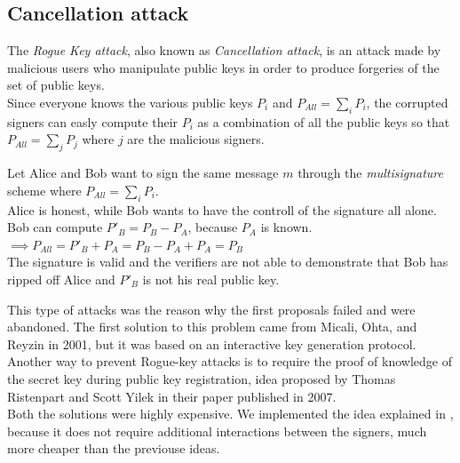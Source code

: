 \subsection{Cancellation attack}
The \textit{Rogue Key attack}, also known as \textit{Cancellation attack}, is an attack made by malicious users who manipulate public keys in order to produce forgeries of the set of public keys.\\
Since everyone knows the various public keys $P_{i}$ and $P_{All}=\sum_{i} P_{i}$, the corrupted signers can easly compute their $P_{i}$ as a combination of all the public keys so that $P_{All}=\sum_{j} P_{j}$ where $j$ are the malicious signers.
\begin{example}
	Let Alice and Bob want to sign the same message $m$ through the \textit{multisignature} scheme where $P_{All}=\sum_{i} P_{i}$.\\
	Alice is honest, while Bob wants to have the controll of the signature all alone.\\
	Bob can compute $P'_{B}=P_{B}-P_{A}$, because $P_{A}$ is known. \\
	$\implies P_{All}=P'_{B}+P_{A}=P_{B}-P_{A}+P_{A}=P_{B}$\\
	The signature is valid and the verifiers are not able to demonstrate that Bob has ripped off Alice and $P'_{B}$ is not his real public key.
\end{example}
This type of attacks was the reason why the first proposals failed and were abandoned. The first solution to this problem came from Micali, Ohta, and Reyzin in 2001, but it was based on an interactive key generation protocol.\\
Another way to prevent Rogue-key attacks is to require the proof of knowledge of the secret key during public key registration, idea proposed by Thomas Ristenpart and Scott Yilek in their paper published in 2007.\\
Both the solutions were highly expensive. We implemented the idea explained in \cite{MuSig}, because it does not require additional interactions between the signers, much more cheaper than the previouse ideas.
